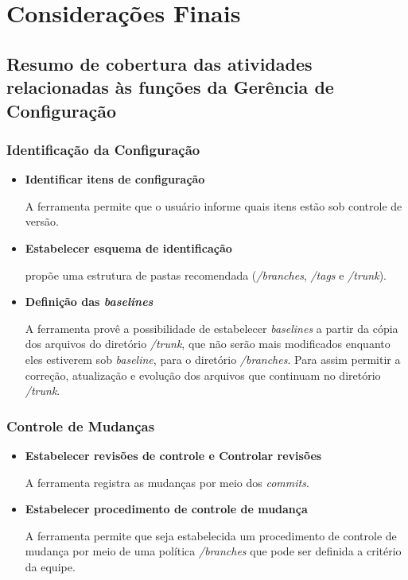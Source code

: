 \chapter[Considerações Finais]{Considerações Finais}

\section{Resumo de cobertura das atividades relacionadas às funções da Gerência de Configuração}
  
 \subsection{Identificação da Configuração}
 \begin{itemize}
  \item \textbf{Identificar itens de configuração}
  
    A ferramenta permite que o usuário informe quais itens estão sob controle de versão. 
    
  \item \textbf{Estabelecer esquema de identificação}
  
   propõe uma estrutura de pastas recomendada (\textit{/branches}, \textit{/tags} e \textit{/trunk}).
  
  \item \textbf{Definição das \textit{baselines}}
  
  A ferramenta provê a possibilidade de estabelecer \textit{baselines} a partir da cópia dos arquivos do diretório \textit{/trunk},
  que não serão mais modificados enquanto eles estiverem sob \textit{baseline}, para o diretório \textit{/branches}. Para assim permitir a correção, atualização e evolução dos 
  arquivos que continuam no diretório \textit{/trunk}. 
 \end{itemize}
 \subsection{Controle de Mudanças}
 \begin{itemize}
  \item \textbf{Estabelecer revisões de controle e Controlar revisões}
  
     A ferramenta registra as mudanças por meio dos \textit{commits}.

  \item \textbf{Estabelecer procedimento de controle de mudança}
  
  A ferramenta permite que seja estabelecida um procedimento de controle de mudança por meio de uma política \textit{/branches}
  que pode ser definida a critério da equipe.

 \end{itemize}
